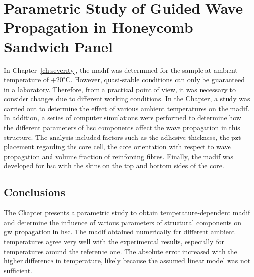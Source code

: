 
\chapter[Parametric Study of Guided Wave Propagation]{Parametric Study of Guided Wave Propagation in Honeycomb Sandwich Panel}
\label{ch:tempEffects}

In Chapter~\ref{ch:severity}, the \ac{madif} was determined for the sample at ambient temperature of \(+20^{\circ}\)C.
However, quasi-stable conditions can only be guaranteed in a laboratory.
Therefore, from a practical point of view, it was necessary to consider changes due to different working conditions.
In the Chapter, a study was carried out to determine the effect of various ambient temperatures on the \ac{madif}.
In addition, a series of computer simulations were performed to determine how the different parameters of \ac{hsc} components affect the wave propagation in this structure.
The analysis included factors such as the adhesive thickness, the \ac{pzt} placement regarding the core cell, the core orientation with respect to wave propagation and volume fraction of reinforcing fibres.
Finally, the \ac{madif} was developed for \ac{hsc} with the skins on the top and bottom sides of the core.


\section{Conclusions}
\label{sec:conclusionsTemp}
The Chapter presents a parametric study to obtain temperature-dependent \ac{madif} and determine the influence of various parameters of structural components on \ac{gw} propagation in \ac{hsc}. The \ac{madif} obtained numerically for different ambient temperatures agree very well with the experimental results, especially for temperatures around the reference one.
The absolute error increased with the higher difference in temperature, likely
because the assumed linear model was not sufficient.

